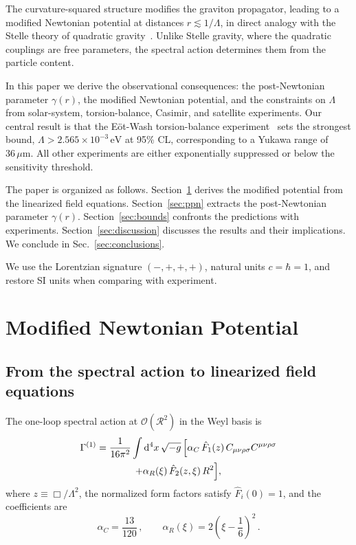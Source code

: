\documentclass[aps,prd,twocolumn,superscriptaddress,nofootinbib,floatfix]{revtex4-2}
\newcommand{\Weylsq}{C_{\mu\nu\rho\sigma}C^{\mu\nu\rho\sigma}}
\newcommand{\dd}{\mathrm{d}}
\newcommand{\order}{\mathcal{O}}
\begin{document}
The curvature-squared structure modifies the graviton propagator, leading
to a modified Newtonian potential at distances $r \lesssim 1/\Lambda$,
in direct analogy with the Stelle theory of quadratic
gravity~\cite{Stelle:1976gc,Stelle:1978}. Unlike Stelle gravity, where
the quadratic couplings are free parameters, the spectral action
determines them from the particle content.

In this paper we derive the observational consequences: the
post-Newtonian parameter $\gamma(r)$, the modified Newtonian potential,
and the constraints on $\Lambda$ from solar-system, torsion-balance,
Casimir, and satellite experiments. Our central result is that the
E\"ot-Wash torsion-balance experiment~\cite{Lee:2020} sets the strongest
bound, $\Lambda > 2.565 \times 10^{-3}\,\mathrm{eV}$ at 95\% CL,
corresponding to a Yukawa range of $36\,\mu\mathrm{m}$. All other
experiments are either exponentially suppressed or below the sensitivity
threshold.

The paper is organized as follows. Section~\ref{sec:potential} derives
the modified potential from the linearized field equations.
Section~\ref{sec:ppn} extracts the post-Newtonian parameter $\gamma(r)$.
Section~\ref{sec:bounds} confronts the predictions with experiments.
Section~\ref{sec:discussion} discusses the results and their
implications. We conclude in Sec.~\ref{sec:conclusions}.

We use the Lorentzian signature $(-,+,+,+)$, natural units
$c = \hbar = 1$, and restore SI units when comparing with experiment.


\section{Modified Newtonian Potential}
\label{sec:potential}

\subsection{From the spectral action to linearized field equations}

The one-loop spectral action at $\order(\mathcal{R}^2)$ in the Weyl
basis is~\cite{Alfyorov:2026ff}
\begin{multline}
  \Gamma^{(1)} = \frac{1}{16\pi^2}\int \dd^4x\,\sqrt{-g}\,
  \Bigl[\alpha_C\,\hat{F}_1(z)\,\Weylsq \\
  + \alpha_R(\xi)\,\hat{F}_2(z,\xi)\,R^2\Bigr],
  \label{eq:action}
\end{multline}
where $z \equiv \Box/\Lambda^2$, the normalized form factors satisfy
$\hat{F}_i(0) = 1$, and the coefficients
are~\cite{Alfyorov:2026ff}
\begin{equation}
  \alpha_C = \frac{13}{120}\,,\qquad
  \alpha_R(\xi) = 2\!\left(\xi - \frac{1}{6}\right)^{\!2}\,.
  \label{eq:alphas}
\end{equation}
\end{document}
